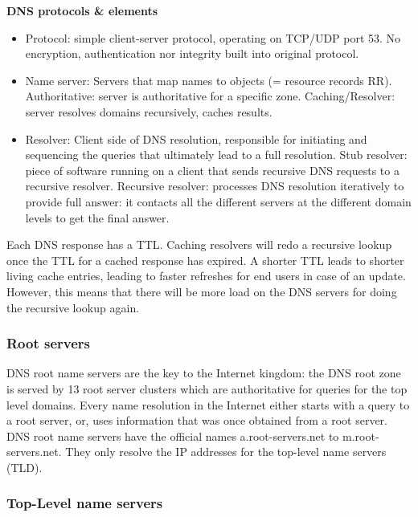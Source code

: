 \documentclass[11pt,oneside,a4paper]{article}
\begin{document}
\noindent \textbf{DNS protocols \& elements}

\vspace{-\topsep}
\begin{itemize}
	\setlength{\itemsep}{0pt}
	\setlength{\parskip}{0pt}
	\item Protocol: simple client-server protocol, operating on TCP/UDP port 53. No encryption, authentication nor integrity built into original protocol.
	\item Name server: Servers that map names to objects (= resource records RR). Authoritative: server is authoritative for a specific zone. Caching/Resolver: server resolves domains recursively, caches	results.
	\item Resolver: Client side of DNS resolution, responsible for initiating and sequencing the queries that ultimately lead to a full resolution. Stub resolver: piece of software running on a client that sends recursive DNS requests to a recursive resolver. Recursive resolver: processes DNS resolution iteratively to	provide full answer: it contacts all the different servers at the different domain levels to get the final answer.
\end{itemize}
\vspace{-\topsep}

\noindent Each DNS response has a TTL. Caching resolvers will redo a recursive lookup once the TTL for a cached response has expired. A shorter TTL leads to shorter living cache entries, leading to faster refreshes for end users in case of an update. However, this means that there will be more load on the DNS servers for doing the recursive lookup again.

\subsubsection{Root servers}

DNS root name servers are the key to the Internet kingdom: the DNS root zone is served by 13 root server clusters which are authoritative for queries for the top level domains. Every name resolution in the Internet either starts with a query to a root server, or, uses information that was once obtained from a root server. DNS root name servers have the official names a.root-servers.net to m.root-servers.net. They only resolve the IP addresses for the top-level name servers (TLD).

\subsubsection{Top-Level name servers}
\end{document}
